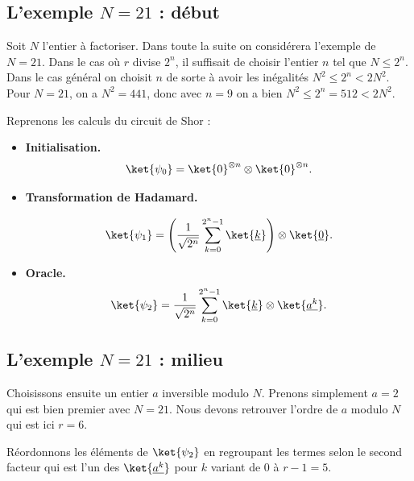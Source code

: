 \documentclass[11pt,class=report,crop=false]{standalone}
\begin{document}
\subsection{L'exemple $N=21$ : début}


Soit $N$ l'entier à factoriser. Dans toute la suite on considérera l'exemple de $N=21$.
Dans le cas où $r$ divise $2^n$, il suffisait de choisir l'entier $n$ tel que $N \le 2^n$. Dans le cas général on choisit $n$ de sorte à avoir les inégalités $N^2 \le 2^n < 2N^2$.
Pour $N=21$, on a $N^2 = 441$, donc avec $n=9$ on a bien $N^2 \le 2^n = 512 < 2N^2$. 

Reprenons les calculs du circuit de Shor :
\begin{itemize}
  \item \textbf{Initialisation.}
$$\ket{\psi_0} = \ket{0}^{\otimes n} \otimes \ket{0}^{\otimes n}.$$

\item \textbf{Transformation de Hadamard.} 

$$\ket{\psi_1} 
= \left(\frac{1}{\sqrt{2^n}} \sum_{k=0}^{2^n-1} \ket{\underline{k}} \right) \otimes \ket{\underline{0}}.$$

  \item \textbf{Oracle.}
  $$\ket{\psi_2} = \frac{1}{\sqrt{2^n}} \sum_{k=0}^{2^n-1} \ket{\underline{k}} \otimes \ket{\underline {a^k}}.$$
\end{itemize}


\subsection{L'exemple $N=21$ : milieu}

Choisissons ensuite un entier $a$ inversible modulo $N$.
Prenons simplement $a=2$ qui est bien premier avec $N=21$.
Nous devons retrouver l'ordre de $a$ modulo $N$ qui est ici $r=6$.

Réordonnons les éléments de $\ket{\psi_2}$ en regroupant les termes selon le second facteur qui est l'un des $\ket{\underline {a^k}}$ pour $k$ variant de $0$ à $r-1=5$.
\end{document}
